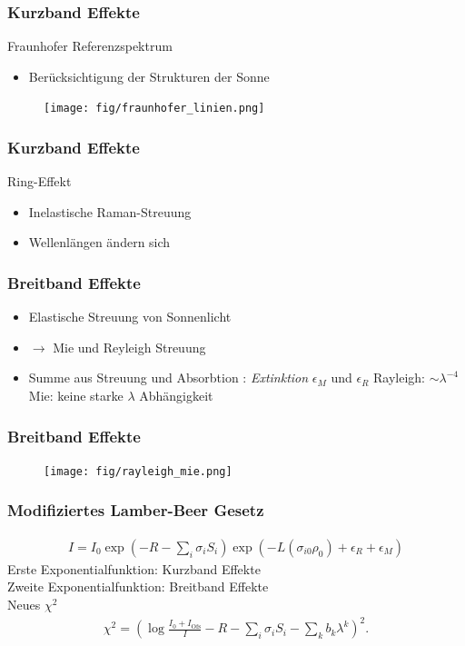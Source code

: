 \documentclass{beamer}
\begin{document}
\begin{frame}
    \frametitle{Kurzband Effekte}
Fraunhofer Referenzspektrum
    \begin{itemize}
        \item Berücksichtigung der Strukturen der Sonne
    \end{itemize}
    \begin{figure}[h]
        \texttt{[image: fig/fraunhofer\_linien.png]}
    \end{figure}
\end{frame}

\begin{frame}
\frametitle{Kurzband Effekte}
    Ring-Effekt
    \begin{itemize}
        \item Inelastische Raman-Streuung
        \item Wellenlängen ändern sich
    \end{itemize}
\end{frame}

\begin{frame}
    \frametitle{Breitband Effekte}
    \begin{itemize}
        \item Elastische Streuung von Sonnenlicht 
        \item $\to$ Mie und Reyleigh Streuung
        \item Summe aus Streuung und Absorbtion : \textit{Extinktion} $\epsilon_M$ und $\epsilon_R$
    Rayleigh: $\sim \lambda^{-4}$\\
    Mie: keine starke $\lambda$ Abhängigkeit
    \end{itemize}
\end{frame}

\begin{frame}
    \frametitle{Breitband Effekte}
    \begin{figure}
    \texttt{[image: fig/rayleigh\_mie.png]}
    \end{figure}
\end{frame}


\begin{frame}
    \frametitle{Modifiziertes Lamber-Beer Gesetz}
    \begin{align}
        I = I_0 \exp(-R - \sum_i \sigma_i S_i) \exp\left(-L (\sigma_{i0}\rho_0) + \epsilon_R + \epsilon_M\right)
    \end{align}
    Erste Exponentialfunktion: Kurzband Effekte\\
    Zweite Exponentialfunktion: Breitband Effekte\\
    \pause
    Neues $\chi^2$
    \begin{align}
        \chi^2 = \left( \log\frac{I_0 + I_\text{Ofs}}{I} - R - \sum_i \sigma_i S_i - \sum_k b_k \lambda^k \right)^2.
    \end{align}
\end{frame}
\end{document}
